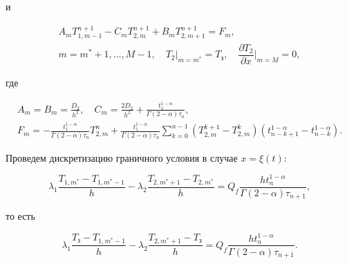 и

\begin{equation}

\label{beib:eq11}

\begin{array}{l}

A_m T_{1,m-1}^{n+1} -C_m   T_{2,m}^{n+1} +B_m T_{2,m+1}^{n+1} =F_m , \\[2mm]

m=m^\ast +1,\ldots,M-1,\quad T_2 \big|_{m=m^\ast } =T_{\text{з}},\quad \dfrac{\partial T_2 }{\partial x}\Big|_{m=M} =0,

\end{array}

\end{equation}

где

\begin{gather}

\label{beib:eq12}

A_m =B_m =\frac{D_2}{h^2},\quad C_m =\frac{2D_2 

}{h^2}+\frac{t_1^{1-\alpha } }{\Gamma (2-\alpha )\tau _n},

\\

\label{beib:eq13}

F_m =-\frac{t_1^{1-\alpha } }{\Gamma (2-\alpha )\tau _n }T_{2,m}^n 

+\frac{t_1^{1-\alpha } }{\Gamma (2-\alpha )\tau _n }\sum\limits_{k=0}^{n-1} 

(T_{2,m}^{k+1} -T_{2,m}^k)   ( t_{n-k+1}^{1-\alpha } -t_{n-k}^{1-\alpha } ).

\end{gather}



Проведем дискретизацию граничного условия в случае $x=\xi (t)$: 

\[

\lambda _1 \frac{T_{1,m^\ast } -T_{1,m^\ast -1} }{h}-\lambda _2 

\frac{T_{2,m^\ast +1} -T_{2,m^\ast } }{h}=Q_f \frac{h  t_n^{1-\alpha } 

}{\Gamma (2-\alpha )  \tau _{n+1} },

\]

то есть 

\[

\lambda _1 \frac{T_{\text{з}} -T_{1,m^\ast -1} }{h}-\lambda _2 \frac{T_{2,m^\ast +1} 

-T_{\text{з}} }{h}=Q_f \frac{h  t_n^{1-\alpha } }{\Gamma (2-\alpha )  \tau 

_{n+1} }.

\]

